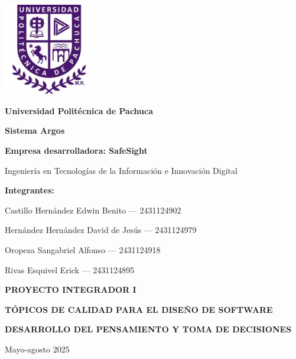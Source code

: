 \begin{titlepage}
    \centering

    \includegraphics[width=0.3\textwidth]{./Media/logo_upp.jpg}\par

    \vspace{1cm}
    {\Huge\bfseries Universidad Politécnica de Pachuca\par}
    \vspace{2cm}

    {\Huge\bfseries Sistema Argos\par}
    \vspace{1.5cm}

    {\Large\bfseries Empresa desarrolladora: SafeSight\par}
    \vspace{0.5cm}

    {\Large Ingeniería en Tecnologías de la Información e Innovación Digital\par}
    \vspace{1cm}

    {\large\bfseries Integrantes:\par}
    \vspace{0.5cm}
    {\large Castillo Hernández Edwin Benito --- 2431124902\par}
    {\large Hernández Hernández David de Jesús --- 2431124979\par}
    {\large Oropeza Sangabriel Alfonso --- 2431124918\par}
    {\large Rivas Esquivel Erick --- 2431124895\par}
    \vspace{0.5cm}

    {\large\bfseries PROYECTO INTEGRADOR I\par}
    {\large\bfseries TÓPICOS DE CALIDAD PARA EL DISEÑO DE SOFTWARE\par}
    {\large\bfseries DESARROLLO DEL PENSAMIENTO Y TOMA DE DECISIONES\par}
    
    \vspace{1cm}

    {\large Mayo-agosto 2025\par}
    \vfill

    \thispagestyle{empty}
\end{titlepage}





